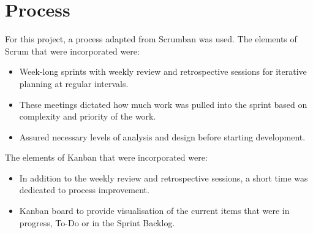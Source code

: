 
\section{Process}

For this project, a process adapted from Scrumban was used. The elements of Scrum that were incorporated were:  
\begin{itemize}
	\item Week-long sprints with weekly review and retrospective sessions for iterative planning at regular intervals.
	\item These meetings dictated how much work was pulled into the sprint based on complexity and priority of the work.
	\item Assured necessary levels of analysis and design before starting development.
\end{itemize}
The elements of Kanban that were incorporated were:
\begin{itemize}
	\item In addition to the weekly review and retrospective sessions, a short time was dedicated to process improvement.
	\item Kanban board to provide visualisation of the current items that were in progress, To-Do or in the Sprint Backlog.
\end{itemize}
